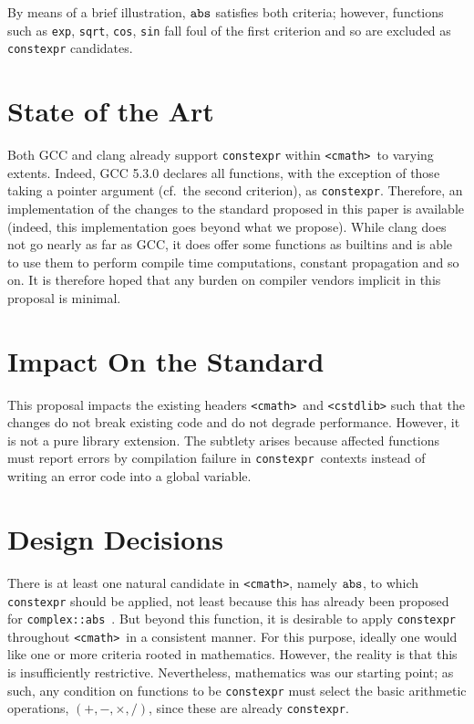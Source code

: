\documentclass[prd,twocolumn,amsmath,amssymb,nofootinbib,eqsecnum]{revtex4-1}
\newcommand{\constexpr}{\code{constexpr}\xspace}
\newcommand{\code}[1]{{\tt #1}}
\newcommand{\header}[1]{{\tt <#1>}}
\newcommand{\cmath}{\header{cmath}}
\begin{document}
By means of a brief illustration, $\code{abs}$ satisfies both criteria; however, functions such as 
\code{exp}, \code{sqrt}, \code{cos}, \code{sin} fall foul of the first criterion and so are excluded as 
\constexpr candidates.


\section{State of the Art}

Both GCC and clang already support \constexpr within \cmath\ to varying extents. 
Indeed, GCC 5.3.0 declares all functions, with the exception of those taking a pointer argument
(cf.\ the second criterion), as \constexpr. Therefore, an implementation of the changes to the standard proposed in this paper is available (indeed, this implementation goes beyond what we propose).
While clang does not go nearly as far as GCC, it does offer some functions as 
builtins and is able to use them to perform compile time computations, constant
propagation and so on. It is therefore hoped that any burden on compiler vendors implicit in this
proposal is minimal.

\section{Impact On the Standard}

This proposal impacts the existing headers \cmath\ and \header{cstdlib} such
that the changes do not break existing code and do not degrade performance.
However, it is not a pure library extension. The subtlety arises because affected
functions must report errors by compilation failure in \constexpr\
contexts instead of writing an error code into a global variable.

\section{Design Decisions}

There is at least one natural candidate in \header{cmath}, namely $\code{abs}$,
to which \constexpr should be applied, not least because this has already been proposed
for \code{complex::abs}~\cite{AP-complex}. But beyond this function, it is desirable to
apply \constexpr throughout \cmath\ in a consistent manner. For this purpose, ideally one would
like one or more criteria rooted in mathematics. However, the reality is that
this is insufficiently restrictive. Nevertheless, mathematics was our starting
point; as such, any condition on functions to be \constexpr must select the
basic arithmetic operations, $(+,-,\times,/)$, since these are already \constexpr.
\end{document}
